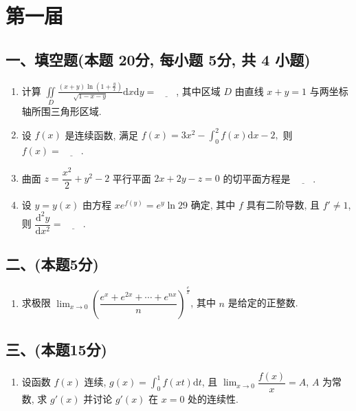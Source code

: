 \section{第一届}

\subsection*{一、填空题(本题 20分,  每小题 5分,  共 4 小题)}

\begin{enumerate}
    \item 计算 $\displaystyle\iint\limits_D \frac{(x + y)\ln\left(1 + \frac{y}{x}\right)}{\sqrt{1 - x - y}}  \mathrm{d}x\mathrm{d}y = \underline{\quad\quad}$,  其中区域 $D$ 由直线 $x + y = 1$ 与两坐标轴所围三角形区域.
    \item 设 $f(x)$ 是连续函数,  满足
          $f(x) = 3x^2 - \displaystyle\int_0^2 f(x)\mathrm{d}x - 2, $
          则 $f(x) = \underline{\quad\quad}$.
    \item 曲面 $z = \dfrac{x^2}{2} + y^2 - 2$ 平行平面 $2x + 2y - z = 0$ 的切平面方程是 $\underline{\quad\quad}$.
    \item 设 $y = y(x)$ 由方程 $xe^{f(y)} = e^y \ln 29$ 确定,  其中 $f$ 具有二阶导数,  且 $f' \neq 1$,  则 $\dfrac{\mathrm{d}^2 y}{\mathrm{d}x^2} = \underline{\quad\quad}$.
\end{enumerate}

\subsection*{二、(本题5分)}

\begin{enumerate}[start=5]
    \item 求极限 $\displaystyle\lim_{x \to 0} \left( \dfrac{e^x + e^{2x} + \cdots + e^{nx}}{n} \right)^{\frac{e}{x}}$,  其中 $n$ 是给定的正整数.
\end{enumerate}

\subsection*{三、(本题15分)}

\begin{enumerate}[start=6]
    \item 设函数 $f(x)$ 连续,  $g(x) = \displaystyle\int_0^1 f(xt)  \mathrm{d}t$,  且 $\displaystyle\lim_{x \to 0} \dfrac{f(x)}{x} = A$,  $A$ 为常数,  求 $g'(x)$ 并讨论 $g'(x)$ 在 $x = 0$ 处的连续性.
\end{enumerate}

